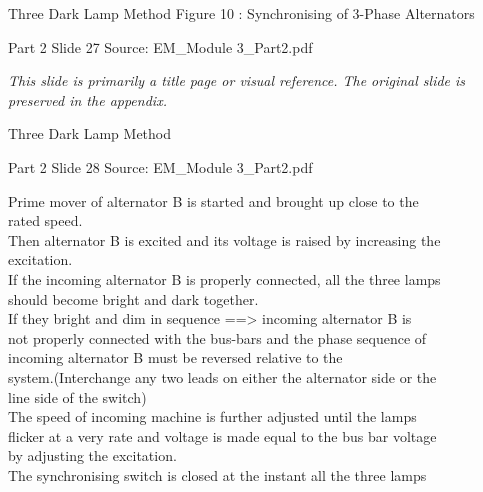 \documentclass[11pt,a4paper]{article}
\begin{document}
\begin{mdframed}[roundcorner=9pt,backgroundcolor=white,linecolor=anthBlue,linewidth=1pt,innerleftmargin=12pt,innerrightmargin=12pt,innertopmargin=10pt,innerbottommargin=10pt,skipabove=8pt,skipbelow=10pt]
{\HeadingFont\fontsize{15}{18}\selectfont\color{anthDark}Three Dark Lamp Method Figure 10 : Synchronising of 3-Phase Alternators\par}
{\color{anthMid}\small Part 2 \textbullet{} Slide 27 \textbullet{} Source: EM\_Module 3\_Part2.pdf\par}
\vspace{0.5em}
{\small
\textit{This slide is primarily a title page or visual reference. The original slide is preserved in the appendix.}

}
\end{mdframed}

\begin{mdframed}[roundcorner=9pt,backgroundcolor=white,linecolor=anthGreen,linewidth=1pt,innerleftmargin=12pt,innerrightmargin=12pt,innertopmargin=10pt,innerbottommargin=10pt,skipabove=8pt,skipbelow=10pt]
{\HeadingFont\fontsize{15}{18}\selectfont\color{anthDark}Three Dark Lamp Method\par}
{\color{anthMid}\small Part 2 \textbullet{} Slide 28 \textbullet{} Source: EM\_Module 3\_Part2.pdf\par}
\vspace{0.5em}
{\small
Prime mover of alternator B is started and brought up close to the\\
rated speed.\\
Then alternator B is excited and its voltage is raised by increasing the\\
excitation.\\
If the incoming alternator B is properly connected, all the three lamps\\
should become bright and dark together.\\
If they bright and dim in sequence   ==>       incoming alternator B is\\
not properly connected with the bus-bars and the phase sequence of\\
incoming alternator B must be reversed relative to the\\
system.(Interchange any two leads on either the alternator side or the\\
line side of the switch)\\
The speed of incoming machine is further adjusted until the lamps\\
flicker at a very rate and voltage is made equal to the bus bar voltage\\
by adjusting the excitation.\\
The synchronising switch is closed at the instant all the three lamps\\

}
\end{mdframed}
\end{document}
